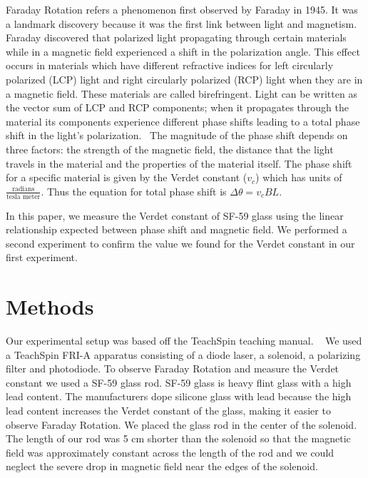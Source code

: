 \documentclass[prb,preprint]{revtex4-1}
\begin{document}
Faraday Rotation refers a phenomenon first observed by Faraday in 1945. It was a landmark discovery because it was the first link between light and magnetism.~\cite{teachspin} Faraday discovered that polarized light propagating through certain materials while in a magnetic field experienced a shift in the polarization angle. This effect occurs in materials which have different refractive indices for left circularly polarized (LCP) light and right circularly polarized (RCP) light when they are in a magnetic field. These materials are called birefringent. Light can be written as the vector sum of LCP and RCP components; when it propagates through the material its components experience different phase shifts leading to a total phase shift in the light's polarization.~\cite{melissanos} The magnitude of the phase shift depends on three factors: the strength of the magnetic field, the distance that the light travels in the material and the properties of the material itself. The phase shift for a specific material is given by the Verdet constant ($v_c$) which has units of $\frac{\text{radians}}{\text{tesla\ meter}}$. Thus the equation for total phase shift is $\Delta \theta = v_c B L$.

In this paper, we measure the Verdet constant of SF-59 glass using the linear relationship expected between phase shift and magnetic field. We performed a second experiment to confirm the value we found for the Verdet constant in our first experiment.

\section{Methods}

Our experimental setup was based off the TeachSpin teaching manual. ~\cite{teachspin} We used a TeachSpin FRI-A apparatus consisting of a diode laser, a solenoid, a polarizing filter and photodiode. To observe Faraday Rotation and measure the Verdet constant we used a SF-59 glass rod. SF-59 glass is heavy flint glass with a high lead content. The manufacturers dope silicone glass with lead because the high lead content increases the Verdet constant of the glass, making it easier to observe Faraday Rotation.\cite{opticalglass} We placed the glass rod in the center of the solenoid. The length of our rod was 5 cm shorter than the solenoid so that the magnetic field was approximately constant across the length of the rod and we could neglect the severe drop in magnetic field near the edges of the solenoid.
\end{document}
